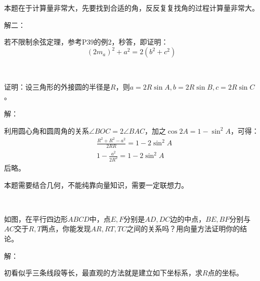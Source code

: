 \begin{tcolorbox}
本题在于计算量非常大，先要找到合适的角，反反复复找角的过程计算量非常大。
\end{tcolorbox}

解二：

若不限制余弦定理，参考P39的例2，秒答，即证明：
\[
\left( 2m_a \right) ^2+a^2=2\left( b^2+c^2 \right)
\]

~

\begin{example}
证明：设三角形的外接圆的半径是$R$，则$a=2R\sin A,b=2R\sin B,c=2R\sin C$。
\end{example}

解：

利用圆心角和圆周角的关系$\angle BOC=2\angle BAC$，加之$\cos 2A=1-\sin ^2A$，可得：
\begin{align*}
&\frac{R^2+R^2-a^2}{2RR}=1-2\sin ^2A \\
&1-\frac{a^2}{2R^2}=1-2\sin ^2A
\end{align*}
后略。

\begin{figure}[h]
\centering
{}
\end{figure}

\begin{tcolorbox}
本题需要结合几何，不能纯靠向量知识，需要一定联想力。
\end{tcolorbox}

~

\begin{example}
如图，在平行四边形$ABCD$中，点$E,F$分别是$AD,DC$边的中点，$BE,BF$分别与$AC$交于$R,T$两点，你能发现$AR,RT,TC$之间的关系吗？用向量方法证明你的结论。
\end{example}

解：

初看似乎三条线段等长，最直观的方法就是建立如下坐标系，求$R$点的坐标。

